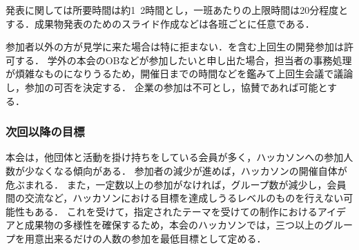 発表に関しては所要時間は約1~2時間とし，一班あたりの上限時間は20分程度とする．成果物発表のためのスライド作成などは各班ごとに任意である．

参加者以外の方が見学に来た場合は特に拒まない．\fourthGrade{}を含む上回生の開発参加は許可する．
学外の本会のOBなどが参加したいと申し出た場合，担当者の事務処理が煩雑なものになりうるため，開催日までの時間などを鑑みて上回生会議で議論し，参加の可否を決定する．
企業の参加は不可とし，協賛であれば可能とする．

\subsubsection*{次回以降の目標}
本会は，他団体と活動を掛け持ちをしている会員が多く，ハッカソンへの参加人数が少なくなる傾向がある．
参加者の減少が進めば，ハッカソンの開催自体が危ぶまれる．
また，一定数以上の参加がなければ，グループ数が減少し，会員間の交流など，ハッカソンにおける目標を達成しうるレベルのものを行えない可能性もある．
これを受けて，指定されたテーマを受けての制作におけるアイデアと成果物の多様性を確保するため，本会のハッカソンでは，三つ以上のグループを用意出来るだけの人数の参加を最低目標として定める．
